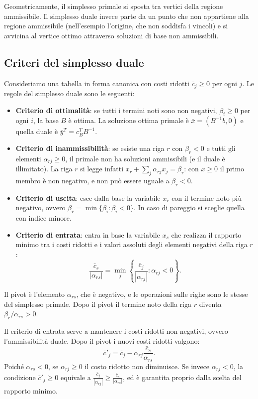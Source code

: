 Geometricamente, il simplesso primale si sposta tra vertici della regione ammissibile. Il simplesso duale invece parte da un punto che non appartiene alla regione ammissibile (nell'esempio l'origine, che non soddisfa i vincoli) e si avvicina al vertice ottimo attraverso soluzioni di base non ammissibili.

\subsection{Criteri del simplesso duale}
Consideriamo una tabella in forma canonica con costi ridotti $\bar{c}_j \ge 0$ per ogni $j$. Le regole del simplesso duale sono le seguenti:
\begin{itemize}
    \item \textbf{Criterio di ottimalità}: se tutti i termini noti sono non negativi, $\beta_i \ge 0$ per ogni $i$, la base $B$ è ottima. La soluzione ottima primale è $\bar{x} = (B^{-1}b, 0)$ e quella duale è $\bar{y}^T = c_B^T B^{-1}$.
    \item \textbf{Criterio di inammissibilità}: se esiste una riga $r$ con $\beta_r < 0$ e tutti gli elementi $\alpha_{rj} \ge 0$, il primale non ha soluzioni ammissibili (e il duale è illimitato). La riga $r$ si legge infatti $x_r + \sum_j \alpha_{rj} x_j = \beta_r$: con $x \ge 0$ il primo membro è non negativo, e non può essere uguale a $\beta_r < 0$.
    \item \textbf{Criterio di uscita}: esce dalla base la variabile $x_r$ con il termine noto più negativo, ovvero $\beta_r = \min\{\beta_i : \beta_i < 0\}$. In caso di pareggio si sceglie quella con indice minore.
    \item \textbf{Criterio di entrata}: entra in base la variabile $x_s$ che realizza il rapporto minimo tra i costi ridotti e i valori assoluti degli elementi negativi della riga $r$:
    \[
    \frac{\bar{c}_s}{|\alpha_{rs}|} = \min_j \left\{ \frac{\bar{c}_j}{|\alpha_{rj}|} : \alpha_{rj} < 0 \right\}.
    \]
\end{itemize}
Il pivot è l'elemento $\alpha_{rs}$, che è negativo, e le operazioni sulle righe sono le stesse del simplesso primale. Dopo il pivot il termine noto della riga $r$ diventa $\beta_r / \alpha_{rs} > 0$.

Il criterio di entrata serve a mantenere i costi ridotti non negativi, ovvero l'ammissibilità duale. Dopo il pivot i nuovi costi ridotti valgono:
\[
\bar{c}'_j = \bar{c}_j - \alpha_{rj} \frac{\bar{c}_s}{\alpha_{rs}}.
\]
Poiché $\alpha_{rs} < 0$, se $\alpha_{rj} \ge 0$ il costo ridotto non diminuisce. Se invece $\alpha_{rj} < 0$, la condizione $\bar{c}'_j \ge 0$ equivale a $\frac{\bar{c}_j}{|\alpha_{rj}|} \ge \frac{\bar{c}_s}{|\alpha_{rs}|}$, ed è garantita proprio dalla scelta del rapporto minimo.

